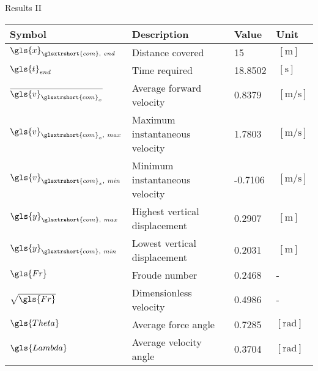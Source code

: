 \begin{frame}{Results II}%
    \begin{center}
        \begin{tabular}{ l|l|l|l }
            \textbf{Symbol}                             & \textbf{Description}              & \textbf{Value}    & \textbf{Unit}                                     \\ [0.5ex]
            \hline \hline
            $\gls{x}_{\glsxtrshort{com},~end}$          & Distance covered                  & 15                &$~\left[\si{\metre}\right]$                        \\
            $\gls{t}_{end}$                             & Time required                     & 18.8502           &$~\left[\si{\second}\right]$                       \\
            $\overline{\gls{v}_{\glsxtrshort{com}_x}}$  & Average forward velocity          & 0.8379            &$~\left[\si{\metre\per\second}\right]$             \\
            $\gls{v}_{\glsxtrshort{com}_x,~max}$        & Maximum instantaneous velocity    & 1.7803            &$~\left[\si{\metre\per\second}\right]$             \\
            $\gls{v}_{\glsxtrshort{com}_x,~min}$        & Minimum instantaneous velocity    & -0.7106           &$~\left[\si{\metre\per\second}\right]$             \\
            $\gls{y}_{\glsxtrshort{com},~max}$          & Highest vertical displacement     & 0.2907            &$~\left[\si{\metre}\right]$                        \\
            $\gls{y}_{\glsxtrshort{com},~min}$          & Lowest vertical displacement      & 0.2031            &$~\left[\si{\metre}\right]$                        \\
            $\gls{Fr}$                                  & Froude number                     & 0.2468            & -                                                 \\
            $\sqrt{\gls{Fr}}$                           & Dimensionless velocity            & 0.4986            & -                                                 \\
            $\gls{Theta}$                               & Average force angle               & 0.7285            & $\left[\si{\radian}\right]$                       \\
            $\gls{Lambda}$                              & Average velocity angle            & 0.3704            & $\left[\si{\radian}\right]$                       \\

\end{tabular}
\end{center}
\end{frame}
